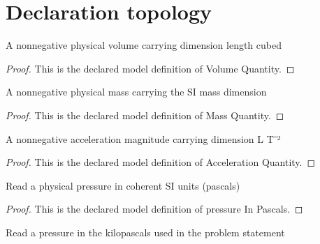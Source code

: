 \section{Declaration topology}
\begin{definition}
  \label{def:physics:phyx-mini-0449:phyxminiproblems-problemphyxmini0449-volumequantity}
  A nonnegative physical volume carrying dimension length cubed
\end{definition}
\begin{proof}
  This is the declared model definition of Volume Quantity.
\end{proof}
\begin{definition}
  \label{def:physics:phyx-mini-0449:phyxminiproblems-problemphyxmini0449-massquantity}
  A nonnegative physical mass carrying the SI mass dimension
\end{definition}
\begin{proof}
  This is the declared model definition of Mass Quantity.
\end{proof}
\begin{definition}
  \label{def:physics:phyx-mini-0449:phyxminiproblems-problemphyxmini0449-accelerationquantity}
  A nonnegative acceleration magnitude carrying dimension L T⁻²
\end{definition}
\begin{proof}
  This is the declared model definition of Acceleration Quantity.
\end{proof}
\begin{definition}
  \label{def:physics:phyx-mini-0449:phyxminiproblems-problemphyxmini0449-pressureinpascals}
  Read a physical pressure in coherent SI units (pascals)
\end{definition}
\begin{proof}
  This is the declared model definition of pressure In Pascals.
\end{proof}
\begin{definition}
  \label{def:physics:phyx-mini-0449:phyxminiproblems-problemphyxmini0449-pressureinkilopascals}
  Read a pressure in the kilopascals used in the problem statement
\end{definition}
